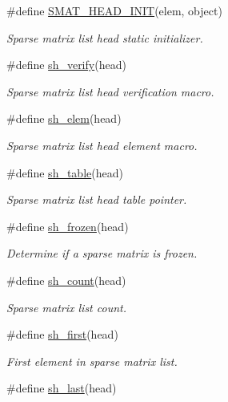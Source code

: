 \begin{CompactItemize}
\#define \hyperlink{group__dbprim__smat_a28}{SMAT\_\-HEAD\_\-INIT}(elem, object)
\begin{CompactList}\small\item\em Sparse matrix list head static initializer. \item\end{CompactList}\item 
\#define \hyperlink{group__dbprim__smat_a29}{sh\_\-verify}(head)
\begin{CompactList}\small\item\em Sparse matrix list head verification macro. \item\end{CompactList}\item 
\#define \hyperlink{group__dbprim__smat_a30}{sh\_\-elem}(head)
\begin{CompactList}\small\item\em Sparse matrix list head element macro. \item\end{CompactList}\item 
\#define \hyperlink{group__dbprim__smat_a31}{sh\_\-table}(head)
\begin{CompactList}\small\item\em Sparse matrix list head table pointer. \item\end{CompactList}\item 
\#define \hyperlink{group__dbprim__smat_a32}{sh\_\-frozen}(head)
\begin{CompactList}\small\item\em Determine if a sparse matrix is frozen. \item\end{CompactList}\item 
\#define \hyperlink{group__dbprim__smat_a33}{sh\_\-count}(head)
\begin{CompactList}\small\item\em Sparse matrix list count. \item\end{CompactList}\item 
\#define \hyperlink{group__dbprim__smat_a34}{sh\_\-first}(head)
\begin{CompactList}\small\item\em First element in sparse matrix list. \item\end{CompactList}\item 
\#define \hyperlink{group__dbprim__smat_a35}{sh\_\-last}(head)

\end{CompactItemize}
